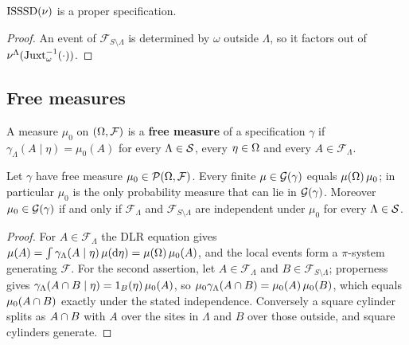 \begin{lemma}
    \label{lem:isssd-proper-spec}
    \leanok

    $\operatorname{ISSSD}(\nu)$ is a proper specification.
\end{lemma}
\begin{proof}

    An event of $\mathcal{F}_{S\setminus\Lambda}$ is determined by $\omega$ outside $\Lambda$, so
    it factors out of $\nu^\Lambda(\operatorname{Juxt}_{\omega}^{-1}(\cdot))$.
\end{proof}

\subsection*{Free measures}

\begin{definition}
    \label{def:free-measure}
    \leanok

    A measure $\mu_0$ on $(\Omega, \mathcal{F})$ is a \textbf{free measure} of a specification
    $\gamma$ if $\gamma_\Lambda(A \mid \eta) = \mu_0(A)$ for every $\Lambda \in \mathcal{S}$, every
    $\eta \in \Omega$ and every $A \in \mathcal{F}_\Lambda$.
\end{definition}

\begin{theorem}
    \label{thm:free-measure-gibbs}
    \leanok

    Let $\gamma$ have free measure $\mu_0 \in \mathcal{P}(\Omega, \mathcal{F})$. Every finite
    $\mu \in \mathcal{G}(\gamma)$ equals $\mu(\Omega)\,\mu_0$; in particular $\mu_0$ is the only
    probability measure that can lie in $\mathcal{G}(\gamma)$. Moreover $\mu_0 \in \mathcal{G}(\gamma)$ if
    and only if $\mathcal{F}_\Lambda$ and $\mathcal{F}_{S \setminus \Lambda}$ are independent
    under $\mu_0$ for every $\Lambda \in \mathcal{S}$.
\end{theorem}
\begin{proof}
    \leanok

    For $A \in \mathcal{F}_\Lambda$ the DLR equation gives
    $\mu(A) = \int \gamma_\Lambda(A \mid \eta)\,\mu(\mathrm{d}\eta) = \mu(\Omega)\,\mu_0(A)$, and
    the local events form a $\pi$-system generating $\mathcal{F}$. For the second assertion, let
    $A \in \mathcal{F}_\Lambda$ and $B \in \mathcal{F}_{S \setminus \Lambda}$; properness gives
    $\gamma_\Lambda(A \cap B \mid \eta) = 1_B(\eta)\,\mu_0(A)$, so
    $\mu_0\gamma_\Lambda(A \cap B) = \mu_0(A)\,\mu_0(B)$, which equals $\mu_0(A \cap B)$
    exactly under the stated independence. Conversely a square cylinder splits as
    $A \cap B$ with $A$ over the sites in $\Lambda$ and $B$ over those outside, and square
    cylinders generate.
\end{proof}

